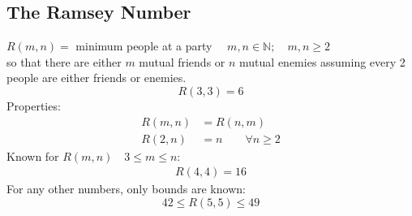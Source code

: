 \documentclass[letterpaper, 12pt]{article}
\newcommand{\N}{\mathbb{N}}
\newcommand{\0}{\emptyset}
\begin{document}
    \subsection*{The Ramsey Number}
    $R(m, n) = $ minimum  people at a party $\quad m, n \in \N; \quad m, n \ge 2$ \\
    so that there are either $m$ mutual friends or $n$ mutual enemies assuming every 2 people 
    are either friends or enemies.
    \[R(3, 3) = 6\]
    Properties:
    \begin{align*}
        R(m, n) &= R(n, m) \\
        R(2, n) &= n \qquad \forall n \ge 2
    \end{align*}
    Known for $R(m, n) \quad 3 \le m \le n$:
    \begin{gather*}
        R(4, 4) = 16
    \end{gather*}
    For any other numbers, only bounds are known:
    \[42 \le R(5, 5) \le 49\]
\end{document}
